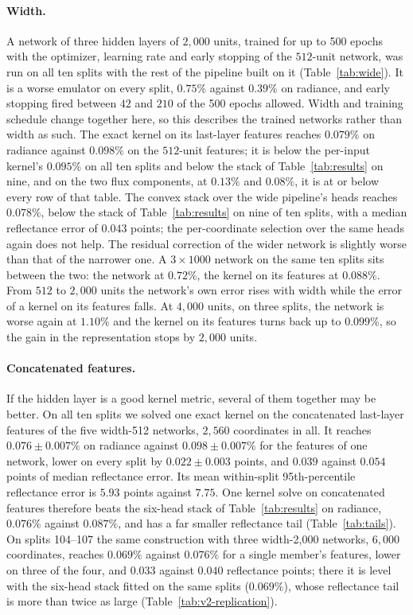 \documentclass[11pt]{article}
\newcommand{\1}{\mathbf{1}}
\begin{document}
\paragraph{Width.} A network of three hidden layers of $2{,}000$ units, trained for up to 500
epochs with the optimizer, learning rate and early stopping of the $512$-unit network, was run on
all ten splits with the rest of the pipeline built on it (Table~\ref{tab:wide}). It is a worse
emulator on every split, $0.75\%$ against $0.39\%$ on radiance, and early stopping fired between
$42$ and $210$ of the 500 epochs allowed. Width and training schedule change together here, so
this describes the trained networks rather than width as such. The exact kernel on its
last-layer features reaches $0.079\%$ on radiance against $0.098\%$ on the $512$-unit features;
it is below the per-input kernel's $0.095\%$ on all ten splits and below the stack of
Table~\ref{tab:results} on nine, and on the two flux components, at $0.13\%$ and $0.08\%$, it is at
or below every row of that table. The convex stack over the wide pipeline's heads reaches
$0.078\%$, below the stack of Table~\ref{tab:results} on nine of ten splits, with a median
reflectance error of $0.043$ points; the per-coordinate selection over the same heads again does
not help. The residual correction of the
wider network is slightly worse than that of the narrower one. A $3\times1000$ network on the same
ten splits sits between the two: the network at $0.72\%$, the kernel on its features at $0.088\%$.
From $512$ to $2{,}000$ units the network's own error rises with width while the error of a kernel
on its features falls. At $4{,}000$ units, on three splits, the network is worse again at
$1.10\%$ and the kernel on its features turns back up to $0.099\%$, so the gain in the
representation stops by $2{,}000$ units.

\paragraph{Concatenated features.} If the hidden layer is a good kernel metric, several of them
together may be better. On all ten splits we solved one exact kernel on the concatenated
last-layer features of the five width-512 networks, $2{,}560$ coordinates in all. It reaches
$0.076\pm0.007\%$ on radiance against $0.098\pm0.007\%$ for the features of one network, lower on
every split by $0.022\pm0.003$ points, and $0.039$ against $0.054$ points of median reflectance
error. Its mean within-split 95th-percentile reflectance error is $5.93$ points against $7.75$.
One kernel solve on concatenated features therefore beats the six-head stack of
Table~\ref{tab:results} on radiance, $0.076\%$ against $0.087\%$, and has a far smaller reflectance
tail (Table~\ref{tab:tails}). On splits 104--107 the same construction with three width-2{,}000
networks, $6{,}000$ coordinates, reaches $0.069\%$ against $0.076\%$ for a single member's
features, lower on three of the four, and $0.033$ against $0.040$ reflectance points; there it is
level with the six-head stack fitted on the same splits ($0.069\%$), whose reflectance tail is
more than twice as large (Table~\ref{tab:v2-replication}).
\end{document}
